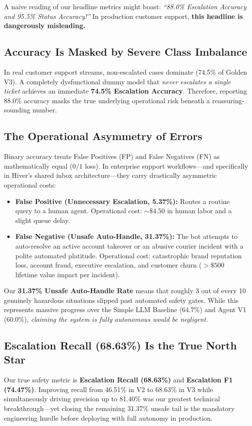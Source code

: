 \documentclass[10pt,twocolumn,a4paper]{article}
\newcommand{\metric}[1]{\textbf{\textcolor{hiverblue}{#1}}}
\newcommand{\bad}[1]{\textbf{\textcolor{accentred}{#1}}}
\begin{document}
A naive reading of our headline metrics might boast: \textit{``88.0\%
Escalation Accuracy and 95.5\% Status Accuracy!''} In production
customer support, \textbf{this headline is dangerously misleading.}

\subsection{Accuracy Is Masked by Severe Class Imbalance}
In real customer support streams, non-escalated cases dominate
(74.5\% of Golden V3). A completely dysfunctional dummy model that
\textit{never escalates a single ticket} achieves an immediate
\textbf{74.5\% Escalation Accuracy}. Therefore, reporting 88.0\%
accuracy masks the true underlying operational risk beneath a
reassuring-sounding number.

\subsection{The Operational Asymmetry of Errors}
Binary accuracy treats False Positives (FP) and False Negatives (FN) as
mathematically equal ($0/1$ loss). In enterprise support workflows---and
specifically in Hiver's shared inbox architecture---they carry
drastically asymmetric operational costs:

\begin{itemize}
  \item \textbf{False Positive (Unnecessary Escalation, 5.37\%):} Routes
        a routine query to a human agent. Operational cost:
        ${\sim}\$4.50$ in human labor and a slight queue delay.

  \item \textbf{False Negative (Unsafe Auto-Handle, 31.37\%):} The bot
        attempts to auto-resolve an active account takeover or an abusive
        courier incident with a polite automated platitude. Operational
        cost: catastrophic brand reputation loss, account fraud,
        executive escalation, and customer churn ($>\$500$ lifetime
        value impact per incident).
\end{itemize}

Our \bad{31.37\% Unsafe Auto-Handle Rate} means that roughly 3 out of
every 10 genuinely hazardous situations slipped past automated safety
gates. While this represents massive progress over the Simple LLM
Baseline (64.7\%) and Agent V1 (60.0\%), \textit{claiming the system
is fully autonomous would be negligent.}

\subsection{Escalation Recall (68.63\%) Is the True North Star}
Our true safety metric is \metric{Escalation Recall (68.63\%)} and
\metric{Escalation F1 (74.47\%)}. Improving recall from 46.51\% in V2
to 68.63\% in V3 while simultaneously driving precision up to 81.40\%
was our greatest technical breakthrough---yet closing the remaining
31.37\% unsafe tail is the mandatory engineering hurdle before
deploying with full autonomy in production.
\end{document}
